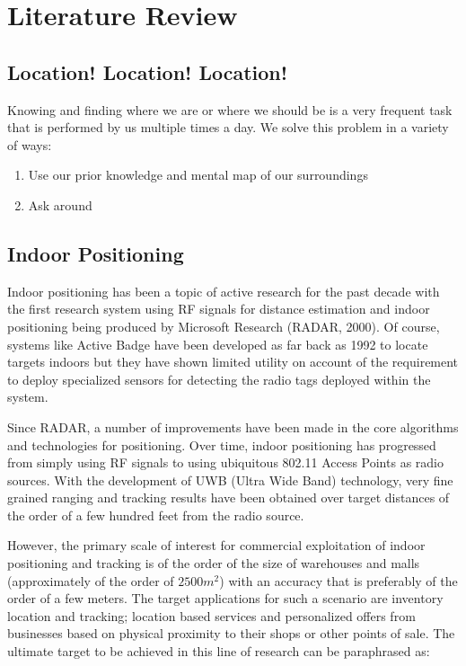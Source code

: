 \chapter{Literature Review\label{chap:literature_review}}

\section{Location! Location! Location!}

Knowing and finding where we are or where we should be is a very frequent 
task that is performed by us multiple times a day. We solve this problem 
in a variety of ways:

\begin{enumerate}
\item Use our prior knowledge and mental map of our surroundings
\item Ask around
\end{enumerate}

\section{Indoor Positioning}

Indoor positioning has been a topic of active research for the past decade with
the first research system using RF signals for distance estimation and indoor
positioning being produced by Microsoft Research (RADAR, 2000)\cite{RADAR}. Of
course, systems like Active Badge\cite{ActiveBadge} have been developed as far
back as 1992 to locate targets indoors but they have shown limited utility on
account of the requirement to deploy specialized sensors for detecting the radio
tags deployed within the system.

Since RADAR, a number of improvements have been made in the core algorithms and
technologies for positioning. Over time, indoor positioning has progressed from
simply using RF signals to using ubiquitous 802.11 Access Points as radio
sources. With the development of UWB (Ultra Wide Band) technology, very fine
grained ranging and tracking results have been obtained over target distances of
the order of a few hundred feet from the radio source. 

However, the primary scale of interest for commercial exploitation of indoor
positioning and tracking is of the order of the size of warehouses and malls
(approximately of the order of $2500 m^2$) with an accuracy that is preferably
of the order of a few meters. The target applications for such a scenario are
inventory location and tracking; location based services and personalized offers
from businesses based on physical proximity to their shops or other points of
sale. The ultimate target to be achieved in this line of research can be
paraphrased as:

